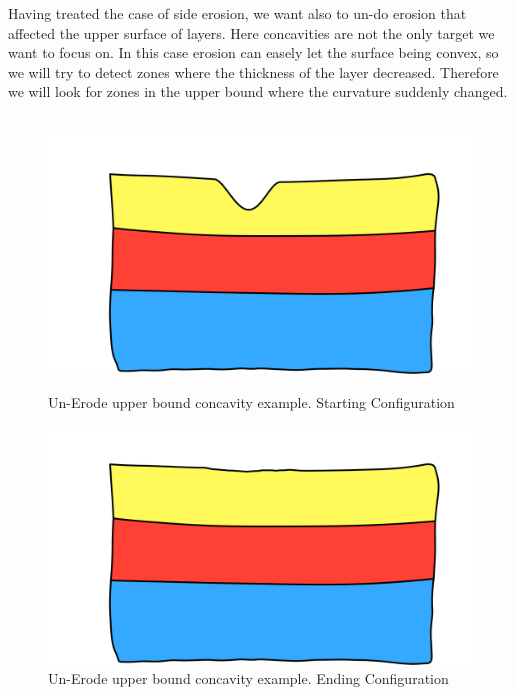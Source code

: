 \documentclass[12pt, a4paper]{report} %
\begin{document}
Having treated the case of side erosion, we want also to un-do erosion that affected the upper surface of layers. Here concavities are not the only target we want to focus on. In this case erosion can easely let the surface being convex, so we will try to detect zones where the thickness of the layer decreased. Therefore we will look for zones in the upper bound where the curvature suddenly changed.\\\\
\begin{figure}[h]
    \begin{minipage}[c]{.46\linewidth}
        \centering
        \includegraphics[scale=0.2]{unErodeUpDescription0.png}
	\caption{Un-Erode upper bound concavity example. Starting Configuration}
    \end{minipage}
    \hfill%
    \begin{minipage}[c]{.46\linewidth}
        \centering
        \includegraphics[scale=0.2]{unErodeUpDescription1.png}
	\caption{Un-Erode upper bound concavity example. Ending Configuration}
    \end{minipage}
\end{figure}\\
\end{document}
